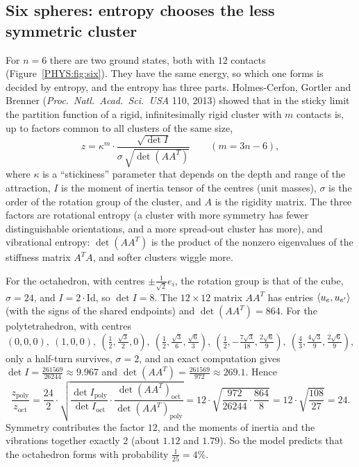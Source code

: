 \subsection*{Six spheres: entropy chooses the less symmetric cluster}
For $n=6$ there are two ground states, both with $12$ contacts (Figure~\ref{PHYS:fig:six}). They have the same
energy, so which one forms is decided by entropy, and the entropy has three parts. Holmes-Cerfon,
Gortler and Brenner (\emph{Proc.\ Natl.\ Acad.\ Sci.\ USA} 110, 2013) showed that in the sticky limit the
partition function of a rigid, infinitesimally rigid cluster with $m$ contacts is, up to factors common
to all clusters of the same size,
\begin{equation}\label{PHYS:eq:sticky}
  z=\kappa^m\cdot\frac{\sqrt{\det I}}{\sigma\,\sqrt{\det(AA^T)}}\qquad(m=3n-6),
\end{equation}
where $\kappa$ is a ``stickiness'' parameter that depends on the depth and range of the attraction, $I$ is the
moment of inertia tensor of the centres (unit masses), $\sigma$ is the order of the rotation group of the
cluster, and $A$ is the rigidity matrix. The three factors are rotational entropy (a cluster with more
symmetry has fewer distinguishable orientations, and a more spread-out cluster has more), and vibrational
entropy: $\det(AA^T)$ is the product of the nonzero eigenvalues of the stiffness matrix $A^TA$, and
softer clusters wiggle more.

\begin{example}[$n=6$ \PHYStag{model}]\label{PHYS:ex:six}
For the octahedron, with centres $\pm\frac1{\sqrt2}e_i$, the rotation group is that of the cube,
$\sigma=24$, and $I=2\cdot\mathrm{Id}$, so $\det I=8$. The $12\times12$ matrix $AA^T$ has entries
$\langle u_e, u_{e'}\rangle$ (with the signs of the shared endpoints) and $\det(AA^T)=864$. For the polytetrahedron,
with centres
\[
  (0,0,0),\ (1,0,0),\ (\tfrac12,\tfrac{\sqrt3}2,0),\ (\tfrac12,\tfrac{\sqrt3}6,\tfrac{\sqrt6}3),\
  (\tfrac12,-\tfrac{7\sqrt3}{18},\tfrac{2\sqrt6}9),\ (\tfrac43,\tfrac{4\sqrt3}9,\tfrac{2\sqrt6}9),
\]
only a half-turn survives, $\sigma=2$, and an exact computation gives $\det I=\frac{261569}{26244}\approx9.967$ and
$\det(AA^T)=\frac{261569}{972}\approx269.1$. Hence
\[
  \frac{z_{\mathrm{poly}}}{z_{\mathrm{oct}}}
  =\frac{24}2\cdot\sqrt{\frac{\det I_{\mathrm{poly}}}{\det I_{\mathrm{oct}}}\cdot\frac{\det(AA^T)_{\mathrm{oct}}}{\det(AA^T)_{\mathrm{poly}}}}
  =12\cdot\sqrt{\frac{972}{26244}\cdot\frac{864}8}=12\cdot\sqrt{\frac{108}{27}}=24 .
\]
Symmetry contributes the factor $12$, and the moments of inertia and the vibrations together exactly $2$
(about $1.12$ and $1.79$). So the model predicts that the octahedron forms with probability $\frac1{25}=4\%$.
\end{example}

